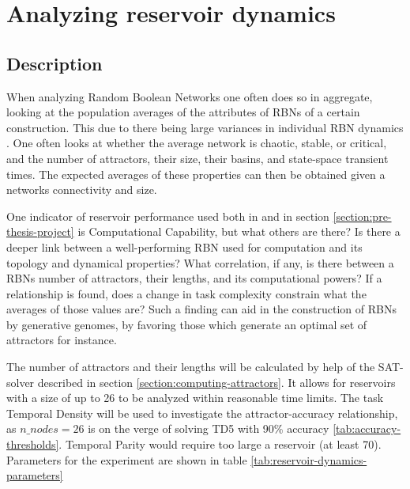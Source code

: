 \section{Analyzing reservoir dynamics}
\label{section:reservoir-dynamics}

\subsection{Description}

When analyzing Random Boolean Networks one often does so in aggregate,
looking at the population averages of the attributes of RBNs of a certain construction.
This due to there being large variances in individual RBN dynamics \cite{gershenson2004introduction}.
One often looks at whether the average network is chaotic, stable, or critical,
and the number of attractors, their size, their basins, and state-space transient times.
The expected averages of these properties can then be obtained given a networks connectivity and size.

One indicator of reservoir performance used both in \cite{rbn-reservoir} and in section \ref{section:pre-thesis-project} is Computational Capability,
but what others are there?
Is there a deeper link between a well-performing RBN used for computation and its topology and dynamical properties?
What correlation, if any, is there between a RBNs number of attractors, their lengths, and its computational powers?
If a relationship is found, does a change in task complexity constrain what the averages of those values are?
Such a finding can aid in the construction of RBNs by generative genomes,
by favoring those which generate an optimal set of attractors for instance.

The number of attractors and their lengths will be calculated by help of the SAT-solver described in section \ref{section:computing-attractors}.
It allows for reservoirs with a size of up to 26 to be analyzed within reasonable time limits.
The task Temporal Density will be used to investigate the attractor-accuracy relationship,
as $ n\_nodes = 26 $ is on the verge of solving TD5 with 90\% accuracy \ref{tab:accuracy-thresholds}.
Temporal Parity would require too large a reservoir (at least 70).
Parameters for the experiment are shown in table \ref{tab:reservoir-dynamics-parameters}

